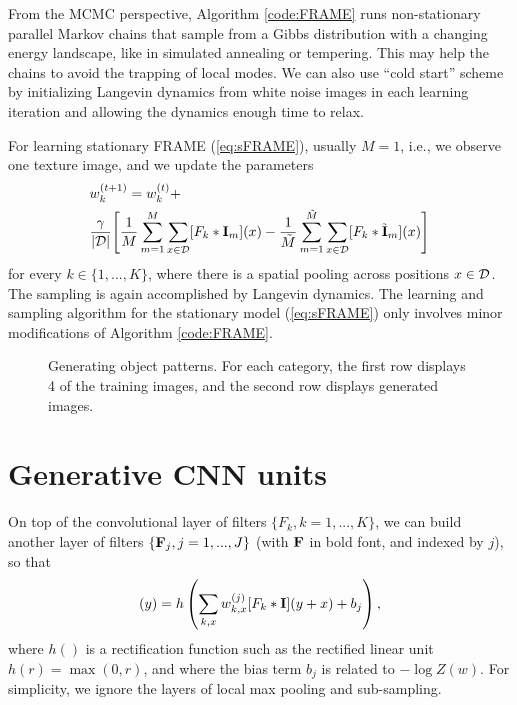 \documentclass[letterpaper]{article}
\def\I{{\bf I}}
\def\tI{\tilde{\bf I}}
\def\F{{\bf F}}
\begin{document}
From the MCMC perspective, Algorithm \ref{code:FRAME} runs non-stationary parallel Markov chains that sample from a Gibbs distribution with a changing energy landscape,  like in  simulated annealing or tempering. This may help the chains to avoid the trapping of local modes.  We can also use ``cold start'' scheme by initializing Langevin dynamics from white noise images in each learning iteration and allowing the dynamics enough time to relax. 

For learning stationary FRAME (\ref{eq:sFRAME}), usually $M = 1$, i.e., we observe one texture image, and we update the parameters
\begin{equation}
\begin{aligned}
&w^{(t+1)}_{k} = w^{(t)}_{k} +
 \\ & \frac{ \gamma}{|{\cal D}|} \Bigg[\frac{1}{M} \sum_{m=1}^{M} \sum_{x \in {\cal D}} [F_k *\I_m](x)
               - \frac{1}{\tilde{M}} \sum_{m=1}^{\tilde{M}} \sum_{x \in {\cal D}} [F_k *\tI_m](x)\Bigg]
\end{aligned}
\label{eq:learning1}
\end{equation}   
for every $k \in \{1, ..., K\}$, where there is a spatial pooling across positions $x \in {\cal D}$. The sampling is again accomplished by Langevin dynamics. The learning and sampling algorithm for the stationary model (\ref{eq:sFRAME}) only involves minor modifications of Algorithm \ref{code:FRAME}. 

\begin{figure}
	\centering
	\setlength{\fboxrule}{1pt}
	\setlength{\fboxsep}{0cm}
	\caption{Generating object patterns. For each category, the first row displays 4 of the training images, and the second row displays generated images.}
	\label{fig:object}
\end{figure}
   
\section{Generative CNN units} 

On top of the convolutional layer of filters $\{F_k, k = 1, ..., K\}$, we can build another layer of filters $\{\F_j, j = 1, ..., J\}$ (with $\F$ in bold font, and indexed by $j$), so that 
\begin{eqnarray}[\F_j*\I](y) = h\left( \sum_{k,  x} w^{(j)}_{k,   x}  [F_{k} * \I](y+x) +b_j\right),
\label{eq:filter}
\end{eqnarray}
where $h()$ is a rectification function such as the rectified linear unit $h(r) = \max(0, r)$, and where the bias term $b_j$ is related  to $-\log Z(w)$. For simplicity, we ignore the layers of local max pooling and sub-sampling.  
\end{document}
